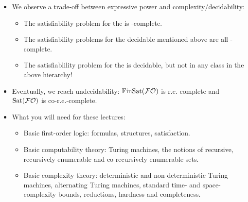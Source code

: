 \documentclass{beamer}
\begin{document}
\begin{frame}
\begin{itemize}
\item We observe a trade-off between expressive power and complexity/decidability:
\begin{itemize}
	\item The satisfiability problem for
	   the  is \NLogSpace-complete.
	\item The satisfiability problems for
	the decidable  mentioned above are all 
	\NExpTime-complete.
	\item The satisfiablility problem for the  is decidable, but not in any class in the above
	hierarchy!
\end{itemize}
\item Eventually, we reach undecidability:  $\mbox{\rm FinSat}(\mathcal{FO})$ is r.e.-complete  and
 $\mbox{\rm Sat}(\mathcal{FO})$ is co-r.e.-complete. 
\end{itemize}
\end{frame}

\begin{frame}
\begin{itemize}
\item What you will need for these lectures:
\begin{itemize}
	\item Basic first-order logic: formulas, structures, satisfaction.
	\item Basic computability theory: Turing machines, the notions of recursive, recursively enumerable and co-recursively enumerable sets. 
	\item Basic complexity theory: deterministic and non-deterministic Turing machines, alternating Turing machines, standard time- and
	space-complexity bounds, reductions, hardness and completeness.
\end{itemize}
\end{itemize}	
\end{frame}
\end{document}
